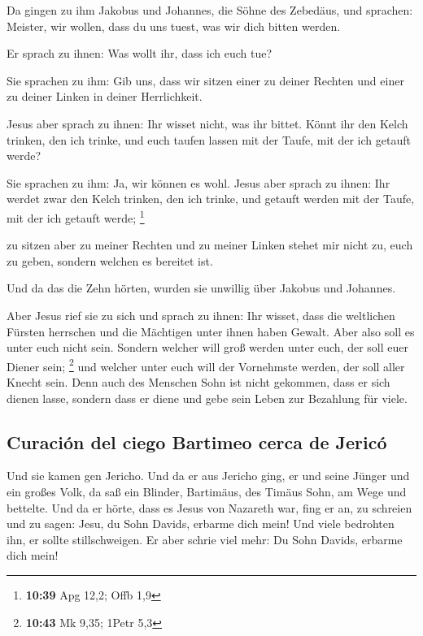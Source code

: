  Da gingen zu ihm Jakobus und Johannes, die Söhne des
Zebedäus, und sprachen: Meister, wir wollen, dass du uns tuest, was wir
dich bitten werden.

 Er sprach zu ihnen: Was wollt ihr, dass ich euch tue?

 Sie sprachen zu ihm: Gib uns, dass wir sitzen einer zu
deiner Rechten und einer zu deiner Linken in deiner Herrlichkeit.

 Jesus aber sprach zu ihnen: Ihr wisset nicht, was ihr
bittet. Könnt ihr den Kelch trinken, den ich trinke, und euch taufen
lassen mit der Taufe, mit der ich getauft werde?

 Sie sprachen zu ihm: Ja, wir können es wohl. Jesus aber
sprach zu ihnen: Ihr werdet zwar den Kelch trinken, den ich trinke, und
getauft werden mit der Taufe, mit der ich getauft werde; \footnote{\textbf{10:39}
  Apg 12,2; Offb 1,9}

 zu sitzen aber zu meiner Rechten und zu meiner Linken
stehet mir nicht zu, euch zu geben, sondern welchen es bereitet ist.

 Und da das die Zehn hörten, wurden sie unwillig über
Jakobus und Johannes.

 Aber Jesus rief sie zu sich und sprach zu ihnen: Ihr
wisset, dass die weltlichen Fürsten herrschen und die Mächtigen unter
ihnen haben Gewalt.  Aber also soll es unter euch nicht
sein. Sondern welcher will groß werden unter euch, der soll euer Diener
sein; \footnote{\textbf{10:43} Mk 9,35; 1Petr 5,3}  und
welcher unter euch will der Vornehmste werden, der soll aller Knecht
sein.  Denn auch des Menschen Sohn ist nicht gekommen,
dass er sich dienen lasse, sondern dass er diene und gebe sein Leben zur
Bezahlung für viele.

\hypertarget{curaciuxf3n-del-ciego-bartimeo-cerca-de-jericuxf3}{%
\subsection{Curación del ciego Bartimeo cerca de
Jericó}\label{curaciuxf3n-del-ciego-bartimeo-cerca-de-jericuxf3}}

 Und sie kamen gen Jericho. Und da er aus Jericho ging,
er und seine Jünger und ein großes Volk, da saß ein Blinder, Bartimäus,
des Timäus Sohn, am Wege und bettelte.  Und da er hörte,
dass es Jesus von Nazareth war, fing er an, zu schreien und zu sagen:
Jesu, du Sohn Davids, erbarme dich mein!  Und viele
bedrohten ihn, er sollte stillschweigen. Er aber schrie viel mehr: Du
Sohn Davids, erbarme dich mein!

